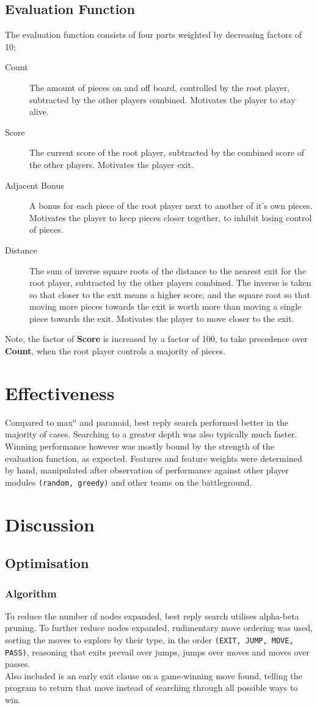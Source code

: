\documentclass[a4paper,10pt,draft]{article}
\begin{document}
\subsection{Evaluation Function}
The evaluation function consists of four parts weighted by decreasing factors of 10;
\begin{description}
	\item[Count] The amount of pieces on and off board, controlled by the root player, subtracted by the other players combined. Motivates the player to stay alive.
	\item[Score] The current score of the root player, subtracted by the combined score of the other players. Motivates the player exit.
	\item[Adjacent Bonus] A bonus for each piece of the root player next to another of it's own pieces. Motivates the player to keep pieces closer together, to inhibit losing control of pieces.
	\item[Distance] The sum of inverse square roots of the distance to the nearest exit for the root player, subtracted by the other players combined. The inverse is taken so that closer to the exit means a higher score, and the square root so that moving more pieces towards the exit is worth more than moving a single piece towards the exit. Motivates the player to move closer to the exit.
\end{description}
Note, the factor of \textbf{Score} is increased by a factor of 100, to take precedence over \textbf{Count}, when the root player controls a majority of pieces. 
\section{Effectiveness}
Compared to max$^n$ and paranoid, best reply search performed better in the majority of cases. Searching to a greater depth was also typically much faster. Winning performance however was mostly bound by the strength of the evaluation function, as expected. Features and feature weights were determined by hand, manipulated after observation of performance against other player modules \texttt{(random, greedy)} and other teams on the battleground.
\section{Discussion}
\subsection{Optimisation}
\subsubsection{Algorithm}
To reduce the number of nodes expanded, best reply search utilises alpha-beta pruning. To further reduce nodes expanded, rudimentary move ordering was used, sorting the moves to explore by their type, in the order \texttt{(EXIT, JUMP, MOVE, PASS)}, reasoning that exits prevail over jumps, jumps over moves and moves over passes.\\
Also included is an early exit clause on a game-winning move found, telling the program to return that move instead of searching through all possible ways to win.
\end{document}
